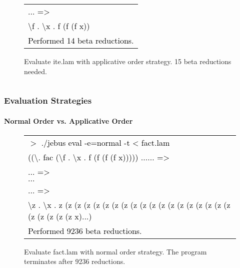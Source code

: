 \documentclass[xcolor=table]{beamer}
\begin{document}
\begin{frame}
\begin{block}
{\begin{columns}[T]
\begin{column}[T]{6cm}
\begin{figure}[h!]
\begin{footnotesize}
\begin{tabular}{l}
			      \textcolor{black}{$\ldots$ =>} \\
			      \textcolor{black}{\textbackslash f . \textbackslash x . f (f (f x))} \\
			      \textcolor{black}{Performed 14 beta reductions.} \\
			      \end{tabular}	
			  \end{footnotesize}			  
			  \caption{Evaluate ite.lam with applicative order strategy. 15 beta reductions needed.}
		 \end{figure}	          
     \end{column}
     \end{columns}
}

\end{block}
\end{frame}


\begin{frame}
\frametitle{Evaluation Strategies}
\framesubtitle{Normal Order vs. Applicative Order}
\begin{block}{
          \begin{figure}[h!]
				 \begin{footnotesize}
				 \begin{tabular}{l}
				 \textcolor{black}{
			      $>$ ./jebus eval -e=normal -t < fact.lam} \\
			      \textcolor{black}{((\textbackslash . fac (\textbackslash f . \textbackslash x . f (f (f (f x))))) $\ldots \ldots$ =>} \\ 
			      \textcolor{black}{$\ldots$ =>} \\
				  \textcolor{black}{$\ldots$} \\
			      \textcolor{black}{$\ldots$ =>} \\
			      \textcolor{black}{\textbackslash z . \textbackslash x . z (z (z (z (z (z (z (z (z (z (z (z (z (z (z (z (z (z (z (z (z (z (z (z x)...)} \\
			      \textcolor{black}{Performed 9236 beta reductions.} \\
			      \end{tabular}	
				 \end{footnotesize}
			  \caption{Evaluate fact.lam with normal order strategy. The program terminates after 9236 reductions.}
		 \end{figure}    
}

\end{block}
\end{frame}
\end{document}
